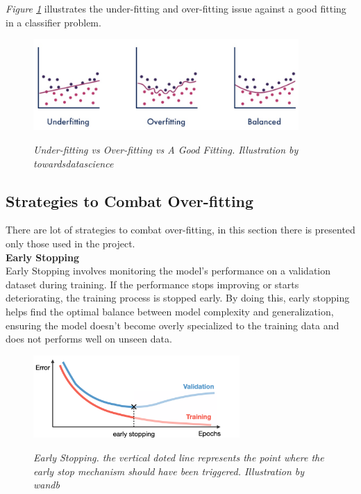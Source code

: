 \textit{Figure \ref{fig:underfitting-overfitting-goodfitting}} illustrates the under-fitting and over-fitting issue against a good fitting in a classifier problem.

\begin{figure}[H]
\centering
\includegraphics[width=0.9\textwidth]{imatges/preliminaries/over-under-base.jpg}
\caption[Under-fitting vs Over-fitting vs Good Fitting]{\textit{Under-fitting vs Over-fitting vs A Good Fitting. Illustration by towardsdatascience}}
{\label{fig:underfitting-overfitting-goodfitting}}
\end{figure}

\subsection{Strategies to Combat Over-fitting}

There are lot of strategies to combat over-fitting, in this section there is presented only those used in the project. \\

\vspace{0.5cm}
\textbf{Early Stopping} \\

Early Stopping involves monitoring the model's performance on a validation dataset during training. If the performance stops improving or starts deteriorating, the training process is stopped early. By doing this, early stopping helps find the optimal balance between model complexity and generalization, ensuring the model doesn't become overly specialized to the training data and does not performs well on unseen data. \\

\begin{figure}[H]
\centering
\includegraphics[width=0.7\textwidth]{imatges/preliminaries/early-stop.png}
\caption[Early Stopping]{\textit{Early Stopping. the vertical doted line represents the point where the early stop mechanism should have been triggered. Illustration by wandb}}
{\label{fig:early-stop}}
\end{figure}


